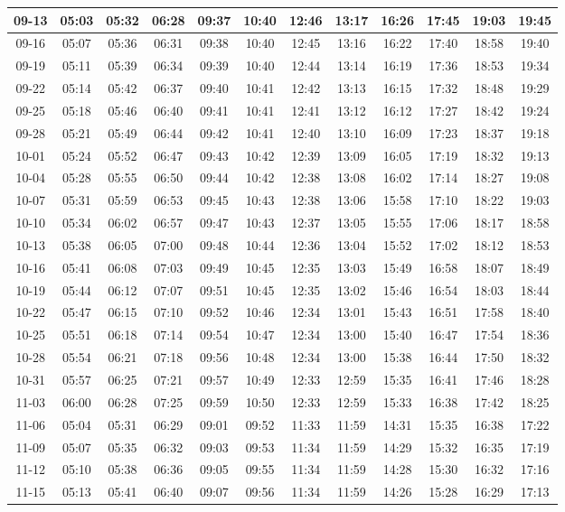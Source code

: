 \begin{footnotesize}
\begin{tabular}{c | c | c| c| c| c| c| c| c| c| c| c}
		09-13&05:03&05:32&06:28&09:37&10:40&12:46&13:17&16:26&17:45&19:03&19:45\\\hline
		09-16&05:07&05:36&06:31&09:38&10:40&12:45&13:16&16:22&17:40&18:58&19:40\\\hline
		09-19&05:11&05:39&06:34&09:39&10:40&12:44&13:14&16:19&17:36&18:53&19:34\\\hline
		09-22&05:14&05:42&06:37&09:40&10:41&12:42&13:13&16:15&17:32&18:48&19:29\\\hline
		09-25&05:18&05:46&06:40&09:41&10:41&12:41&13:12&16:12&17:27&18:42&19:24\\\hline
		09-28&05:21&05:49&06:44&09:42&10:41&12:40&13:10&16:09&17:23&18:37&19:18\\\hline
		10-01&05:24&05:52&06:47&09:43&10:42&12:39&13:09&16:05&17:19&18:32&19:13\\\hline
		10-04&05:28&05:55&06:50&09:44&10:42&12:38&13:08&16:02&17:14&18:27&19:08\\\hline
		10-07&05:31&05:59&06:53&09:45&10:43&12:38&13:06&15:58&17:10&18:22&19:03\\\hline
		10-10&05:34&06:02&06:57&09:47&10:43&12:37&13:05&15:55&17:06&18:17&18:58\\\hline
		10-13&05:38&06:05&07:00&09:48&10:44&12:36&13:04&15:52&17:02&18:12&18:53\\\hline
		10-16&05:41&06:08&07:03&09:49&10:45&12:35&13:03&15:49&16:58&18:07&18:49\\\hline
		10-19&05:44&06:12&07:07&09:51&10:45&12:35&13:02&15:46&16:54&18:03&18:44\\\hline
		10-22&05:47&06:15&07:10&09:52&10:46&12:34&13:01&15:43&16:51&17:58&18:40\\\hline
		10-25&05:51&06:18&07:14&09:54&10:47&12:34&13:00&15:40&16:47&17:54&18:36\\\hline
		10-28&05:54&06:21&07:18&09:56&10:48&12:34&13:00&15:38&16:44&17:50&18:32\\\hline
		10-31&05:57&06:25&07:21&09:57&10:49&12:33&12:59&15:35&16:41&17:46&18:28\\\hline
		11-03&06:00&06:28&07:25&09:59&10:50&12:33&12:59&15:33&16:38&17:42&18:25\\\hline
		11-06&05:04&05:31&06:29&09:01&09:52&11:33&11:59&14:31&15:35&16:38&17:22\\\hline
		11-09&05:07&05:35&06:32&09:03&09:53&11:34&11:59&14:29&15:32&16:35&17:19\\\hline
		11-12&05:10&05:38&06:36&09:05&09:55&11:34&11:59&14:28&15:30&16:32&17:16\\\hline
		11-15&05:13&05:41&06:40&09:07&09:56&11:34&11:59&14:26&15:28&16:29&17:13\\\hline

\end{tabular}
\end{footnotesize}
